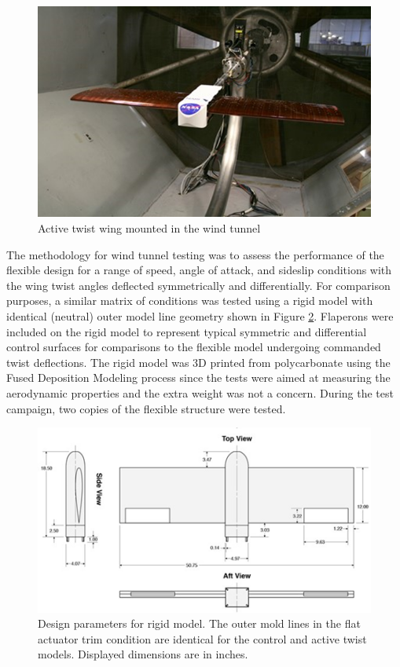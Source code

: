 \documentclass[11pt]{ucthesis}
\begin{document}
\begin{figure}[thpb]
\centering
\includegraphics[width=0.75\linewidth]{Figures/wingFlex.png}
\caption{Active twist wing mounted in the wind tunnel}
\label{fig:flex}
\end{figure}

The methodology for wind tunnel testing was to assess the performance of the flexible design for a range of speed, angle of attack, and sideslip conditions with the wing twist angles deflected symmetrically and differentially. For comparison purposes, a similar matrix of conditions was tested using a rigid model with identical (neutral) outer model line geometry shown in Figure \ref{fig:rigid}. Flaperons were included on the rigid model to represent typical symmetric and differential control surfaces for comparisons to the flexible model undergoing commanded twist deflections. The rigid model was 3D printed from polycarbonate using the Fused Deposition Modeling process since the tests were aimed at measuring the aerodynamic properties and the extra weight was not a concern. During the test campaign, two copies of the flexible structure were tested.

\begin{figure}[thpb]
\centering
\includegraphics[width=0.75\linewidth]{Figures/rigidModel.png}
\caption{Design parameters for rigid model. The outer mold lines in the flat actuator trim condition are identical for the control and active twist models. Displayed dimensions are in inches.}
\label{fig:rigid}
\end{figure}
\end{document}

